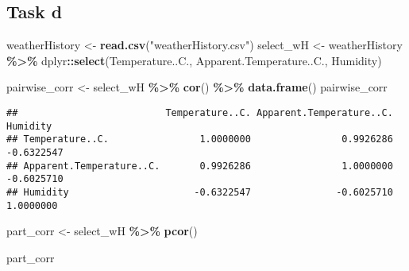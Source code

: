 \documentclass[
]{article}
\newenvironment{Shaded}{\begin{snugshade}}{\end{snugshade}}
\newcommand{\FunctionTok}[1]{\textcolor[rgb]{0.13,0.29,0.53}{\textbf{#1}}}
\newcommand{\NormalTok}[1]{#1}
\newcommand{\OtherTok}[1]{\textcolor[rgb]{0.56,0.35,0.01}{#1}}
\newcommand{\SpecialCharTok}[1]{\textcolor[rgb]{0.81,0.36,0.00}{\textbf{#1}}}
\newcommand{\StringTok}[1]{\textcolor[rgb]{0.31,0.60,0.02}{#1}}
\begin{document}
\subsection{Task d}\label{task-d-2}

\begin{Shaded}
\begin{Highlighting}[]
\NormalTok{weatherHistory }\OtherTok{\textless{}{-}} \FunctionTok{read.csv}\NormalTok{(}\StringTok{"weatherHistory.csv"}\NormalTok{)}
\NormalTok{select\_wH }\OtherTok{\textless{}{-}}\NormalTok{ weatherHistory }\SpecialCharTok{\%\textgreater{}\%}\NormalTok{ dplyr}\SpecialCharTok{::}\FunctionTok{select}\NormalTok{(Temperature..C., Apparent.Temperature..C., Humidity)}
\end{Highlighting}
\end{Shaded}

\begin{Shaded}
\begin{Highlighting}[]
\NormalTok{pairwise\_corr }\OtherTok{\textless{}{-}}\NormalTok{ select\_wH }\SpecialCharTok{\%\textgreater{}\%}
  \FunctionTok{cor}\NormalTok{() }\SpecialCharTok{\%\textgreater{}\%}
  \FunctionTok{data.frame}\NormalTok{()}
\NormalTok{pairwise\_corr}
\end{Highlighting}
\end{Shaded}

\begin{verbatim}
##                          Temperature..C. Apparent.Temperature..C.   Humidity
## Temperature..C.                1.0000000                0.9926286 -0.6322547
## Apparent.Temperature..C.       0.9926286                1.0000000 -0.6025710
## Humidity                      -0.6322547               -0.6025710  1.0000000
\end{verbatim}

\begin{Shaded}
\begin{Highlighting}[]
\NormalTok{part\_corr }\OtherTok{\textless{}{-}}\NormalTok{ select\_wH }\SpecialCharTok{\%\textgreater{}\%}
  \FunctionTok{pcor}\NormalTok{()}

\NormalTok{part\_corr}
\end{Highlighting}
\end{Shaded}
\end{document}
